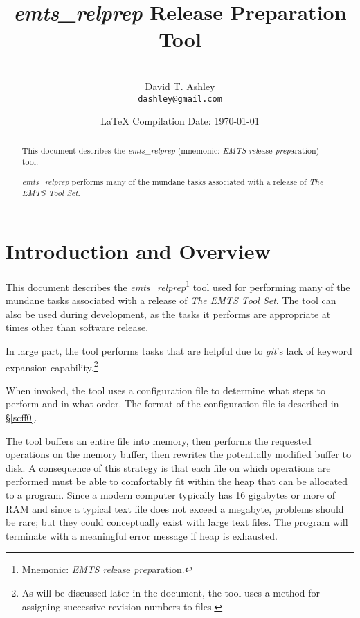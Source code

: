 \documentclass[letterpaper,10pt,titlepage]{article}
\begin{document}
\title{\emph{emts\_relprep} Release Preparation Tool}
\author{\vspace{30mm}\\David T. Ashley\\\texttt{dashley@gmail.com}\\\vspace{1cm}}
\date{\vspace*{38mm}\small{\LaTeX{} Compilation Date: \today{}}}
\maketitle

%
\begin{abstract}
This document describes the \emph{emts\_relprep} (mnemonic:  
\emph{EMTS} \emph{rel}ease
\emph{prep}aration) tool.

\emph{emts\_relprep} performs many of the mundane tasks associated with
a release of \emph{The EMTS Tool Set}.
\end{abstract}


\section{Introduction and Overview}
\label{siov0}

This document describes the \emph{emts\_relprep}\footnote{Mnemonic:  
\emph{EMTS} \emph{rel}ease
\emph{prep}aration.} tool used for performing many of the 
mundane tasks associated with a release of \emph{The EMTS Tool Set}.
The tool can also be used during development, as the tasks it performs
are appropriate at times other than software release.

In large part, the tool performs tasks that are helpful due to \emph{git}'s
lack of keyword expansion capability.\footnote{As will be discussed later in
the document, the tool uses a method for assigning successive revision numbers
to files.}
  
When invoked, the tool uses a configuration file to determine what steps to
perform and in what order.  The format of the configuration file is
described in \S{}\ref{scff0}.

The tool buffers an entire file into memory, then performs the requested
operations on the memory buffer, then rewrites the potentially modified buffer
to disk.  A consequence of this strategy is that each file on which operations
are performed must be able to comfortably fit within the heap that can be
allocated to a program.  Since a modern computer typically has 16 gigabytes or
more of RAM and since a typical text file does not exceed a megabyte, problems
should be rare; but they could conceptually exist with large text files.
The program will terminate with a meaningful error message if heap is exhausted.
\end{document}
